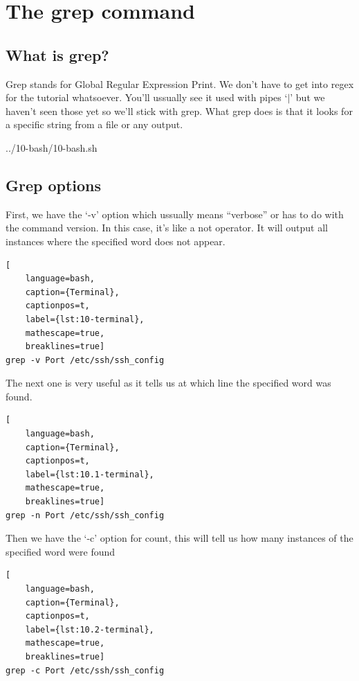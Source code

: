 \chapter{The grep command}

\section{What is grep?}

Grep stands for Global Regular Expression Print. We don't have to get into regex for the tutorial whatsoever.
You'll ussually see it used with pipes `$|$' but we haven't seen those yet so we'll stick with grep. What grep
does is that it looks for a specific string from a file or any output.


{../10-bash/10-bash.sh}

\section{Grep options}

First, we have the `-v' option which ussually means ``verbose'' or has to do with the command version.
In this case, it's like a not operator. It will output all instances where the specified word does not appear.

\begin{lstlisting}[
    language=bash, 
    caption={Terminal},
    captionpos=t,
    label={lst:10-terminal}, 
    mathescape=true, 
    breaklines=true]
grep -v Port /etc/ssh/ssh_config
\end{lstlisting}

The next one is very useful as it tells us at which line the specified word was found.

\begin{lstlisting}[
    language=bash, 
    caption={Terminal},
    captionpos=t,
    label={lst:10.1-terminal}, 
    mathescape=true, 
    breaklines=true]
grep -n Port /etc/ssh/ssh_config
\end{lstlisting}

Then we have the `-c' option for count, this will tell us how many instances of the specified word were
found

\begin{lstlisting}[
    language=bash, 
    caption={Terminal},
    captionpos=t,
    label={lst:10.2-terminal}, 
    mathescape=true, 
    breaklines=true]
grep -c Port /etc/ssh/ssh_config
\end{lstlisting}

